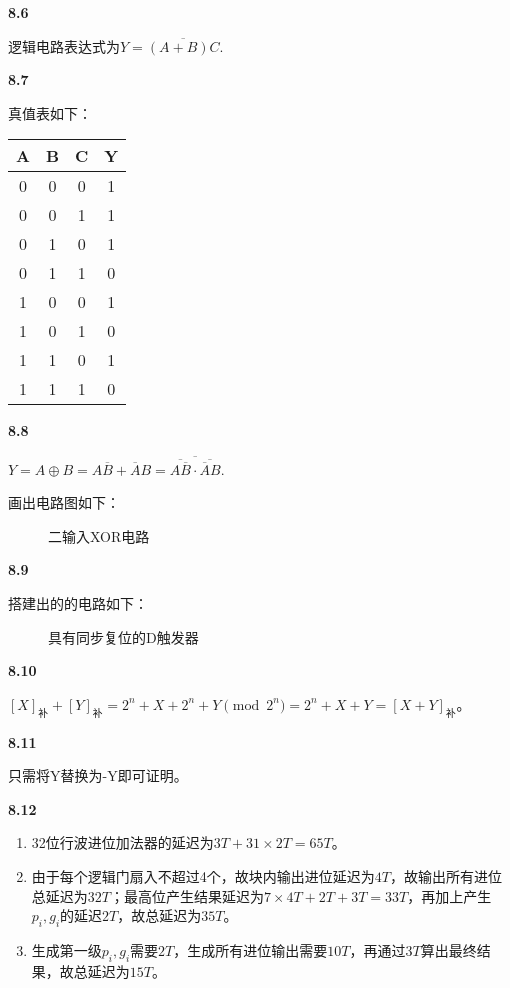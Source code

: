 \documentclass[UTF8]{report}
\begin{document}
\noindent
\textbf{8.6}

逻辑电路表达式为$Y = \overline{(A + B)C}$.

\noindent
\textbf{8.7}

真值表如下：

\begin{table}[H]
    \centering
    \begin{tabular}{|cccc|}
        \hline
        A & B & C & Y \\
        \hline
        0 & 0 & 0 & 1 \\
        0 & 0 & 1 & 1 \\
        0 & 1 & 0 & 1 \\
        0 & 1 & 1 & 0 \\
        1 & 0 & 0 & 1 \\
        1 & 0 & 1 & 0 \\
        1 & 1 & 0 & 1 \\
        1 & 1 & 1 & 0 \\
        \hline
    \end{tabular}
\end{table}

\noindent
\textbf{8.8}

$Y = A \oplus B = A\overline{B} + \overline{A}B = \overline{\overline{A\overline{B}} \cdot \overline{\overline{A}B}}$.

画出电路图如下：

\begin{figure}[H]
    \centering
    
    \caption{二输入XOR电路}
\end{figure}

\noindent
\textbf{8.9}

搭建出的的电路如下：

\begin{figure}[H]
    \centering
    
    \caption{具有同步复位的D触发器}
\end{figure}

\noindent
\textbf{8.10}

$[X]_{\text{补}} + [Y]_{\text{补}} = 2^n + X + 2^n + Y \pmod {2^n} = 2^n + X + Y = [X+Y]_{\text{补}}$。

\noindent
\textbf{8.11}

只需将Y替换为-Y即可证明。

\noindent
\textbf{8.12}

\begin{enumerate}[label=(\arabic*)]
    \item 32位行波进位加法器的延迟为$3T + 31 \times 2T = 65T$。
    \item 由于每个逻辑门扇入不超过4个，故块内输出进位延迟为$4T$，故输出所有进位总延迟为$32T$；最高位产生结果延迟为$7 \times 4T + 2T + 3T = 33T$，再加上产生$p_i, g_i$的延迟$2T$，故总延迟为$35T$。
    \item 生成第一级$p_i, g_i$需要$2T$，生成所有进位输出需要$10T$，再通过$3T$算出最终结果，故总延迟为$15T$。
\end{enumerate}
\end{document}
